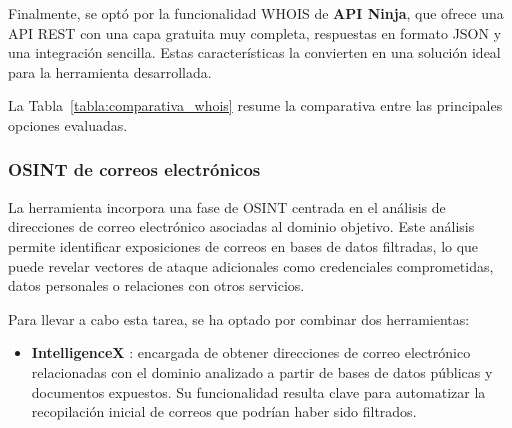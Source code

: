 \begin{parskipenv}
Finalmente, se optó por la funcionalidad WHOIS de \textbf{API Ninja}, que ofrece una API REST con una capa gratuita muy completa, respuestas en formato JSON y una integración sencilla. Estas características la convierten en una solución ideal para la herramienta desarrollada.

La Tabla~\ref{tabla:comparativa_whois} resume la comparativa entre las principales opciones evaluadas.

\begin{table}[H]
\centering
\renewcommand{\arraystretch}{1.4}
\caption{Comparativa de herramientas para consultas WHOIS.}
\label{tabla:comparativa_whois}
\end{table}

\subsubsection*{OSINT de correos electrónicos}
La herramienta incorpora una fase de OSINT centrada en el análisis de direcciones de correo electrónico asociadas al dominio objetivo. Este análisis permite identificar exposiciones de correos en bases de datos filtradas, lo que puede revelar vectores de ataque adicionales como credenciales comprometidas, datos personales o relaciones con otros servicios.

Para llevar a cabo esta tarea, se ha optado por combinar dos herramientas:

\begin{itemize}
  \item \textbf{IntelligenceX} \cite{intelligencex}: encargada de obtener direcciones de correo electrónico relacionadas con el dominio analizado a partir de bases de datos públicas y documentos expuestos. Su funcionalidad resulta clave para automatizar la recopilación inicial de correos que podrían haber sido filtrados.


\end{itemize}
\end{parskipenv}
